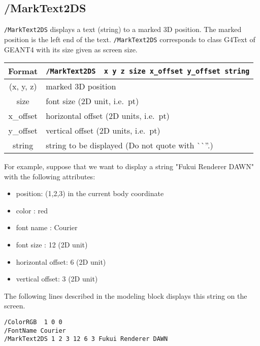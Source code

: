 \subsection{/MarkText2DS}  
\verb+/MarkText2DS+ displays a text (string) to a marked 3D position. 
The marked position is the left end of the text.
\verb+/MarkText2DS+ corresponds to class G4Text of GEANT4 with
its size given as screen size.
\vspace{.20in}

\begin{tabular}{|c|l|}
\hline%
Format     & \verb+/MarkText2DS  x y z size x_offset y_offset string+\\
\hline%
(x, y, z)  &  marked 3D position  \\
\hline%
size       &  font size  (2D unit, i.e.~pt) \\
\hline%
x\_offset   &  horizontal offset (2D units, i.e.~pt) \\
\hline%
y\_offset   &  vertical   offset (2D units, i.e.~pt) \\
\hline%
string     &  string to be displayed (Do not quote with ^^ ^^ ''.)\\
\hline%
\end{tabular}
\vspace{.20in}

\noindent
For example, suppose that we want to display a string 
"Fukui Renderer DAWN" with the following attributes:

\begin{itemize}
\item   position: (1,2,3) in the current body coordinate
\item   color   : red  
\item   font name  : Courier  
\item   font size  : 12      (2D unit)
\item   horizontal offset: 6 (2D unit) 
\item   vertical offset:   3 (2D unit) 
\end{itemize}

\noindent
The following lines described in the modeling block 
displays this string on the screen.
\begin{verbatim}
/ColorRGB  1 0 0  
/FontName Courier 
/MarkText2DS 1 2 3 12 6 3 Fukui Renderer DAWN
\end{verbatim}
\vspace{.20in}

